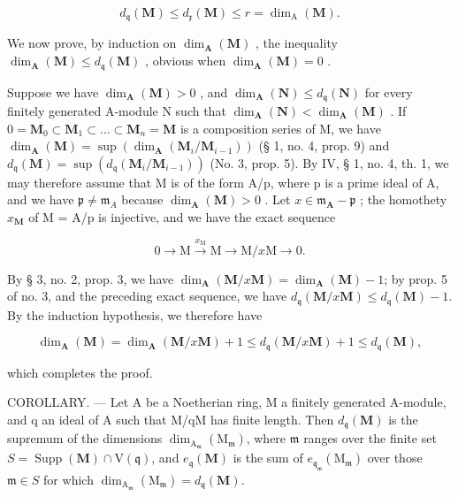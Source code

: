 \[
d _ {\mathfrak{q}} (\mathbf {M}) \leqslant d _ {\mathfrak{x}} (\mathbf {M}) \leqslant r = \dim_ {\mathrm{A}} (\mathbf {M}).
\]

We now prove, by induction on \(\dim_{\mathbf{A}}(\mathbf{M})\) , the inequality \(\dim_{\mathbf{A}}(\mathbf{M}) \leqslant d_{\mathfrak{q}}(\mathbf{M})\) , obvious when \(\dim_{\mathbf{A}}(\mathbf{M}) = 0\) .

Suppose we have \(\dim_{\mathbf{A}}(\mathbf{M}) > 0\) , and \(\dim_{\mathbf{A}}(\mathbf{N}) \leqslant d_{\mathfrak{q}}(\mathbf{N})\) for every finitely generated A-module N such that \(\dim_{\mathbf{A}}(\mathbf{N}) < \dim_{\mathbf{A}}(\mathbf{M})\) . If \(0 = \mathbf{M}_0 \subset \mathbf{M}_1 \subset \ldots \subset \mathbf{M}_n = \mathbf{M}\) is a composition series of M, we have \(\dim_{\mathbf{A}}(\mathbf{M}) = \sup(\dim_{\mathbf{A}}(\mathbf{M}_i / \mathbf{M}_{i-1}))\) (§ 1, no. 4, prop. 9) and \(d_{\mathfrak{q}}(\mathbf{M}) = \sup(d_{\mathfrak{q}}(\mathbf{M}_i / \mathbf{M}_{i-1}))\) (No. 3, prop. 5). By IV, § 1, no. 4, th. 1, we may therefore assume that M is of the form A/p, where p is a prime ideal of A, and we have \(\mathfrak{p} \ne \mathfrak{m}_{A}\) because \(\dim_{\mathbf{A}}(\mathbf{M}) > 0\) . Let \(x \in \mathfrak{m}_{\mathbf{A}} - \mathfrak{p}\) ; the homothety \(x_{\mathbf{M}}\) of M = A/p is injective, and we have the exact sequence

\[
0 \longrightarrow \mathrm{M} \xrightarrow {x _ {\mathrm{M}}} \mathrm{M} \longrightarrow \mathrm{M} / x \mathrm{M} \longrightarrow 0.
\]

By § 3, no. 2, prop. 3, we have \(\dim_{\mathbf{A}}(\mathbf{M}/x\mathbf{M}) = \dim_{\mathbf{A}}(\mathbf{M}) - 1\); by prop. 5 of no. 3, and the preceding exact sequence, we have \(d_{\mathfrak{q}}(\mathbf{M}/x\mathbf{M}) \leqslant d_{\mathfrak{q}}(\mathbf{M}) - 1\). By the induction hypothesis, we therefore have

\[
\dim_ {\mathbf {A}} (\mathbf {M}) = \dim_ {\mathbf {A}} (\mathbf {M} / x \mathbf {M}) + 1 \leqslant d _ {\mathfrak {q}} (\mathbf {M} / x \mathbf {M}) + 1 \leqslant d _ {\mathfrak {q}} (\mathbf {M}),
\]

which completes the proof.

COROLLARY. --- Let A be a Noetherian ring, M a finitely generated A-module, and q an ideal of A such that M/qM has finite length. Then \(d_{\mathfrak{q}}(\mathbf{M})\) is the supremum of the dimensions \(\dim_{\mathrm{A}_{\mathfrak{m}}}\left(\mathrm{M}_{\mathfrak{m}}\right)\), where \(\mathfrak{m}\) ranges over the finite set \(S = \operatorname{Supp}(\mathbf{M}) \cap \mathrm{V}(\mathfrak{q})\), and \(e_{\mathfrak{q}}(\mathbf{M})\) is the sum of \(e_{\mathfrak{q}_{\mathfrak{m}}}\left(\mathrm{M}_{\mathfrak{m}}\right)\) over those \(\mathfrak{m}\in S\) for which \(\dim_{\mathrm{A}_{\mathfrak{m}}}\left(\mathrm{M}_{\mathfrak{m}}\right) = d_{\mathfrak{q}}(\mathbf{M})\).


